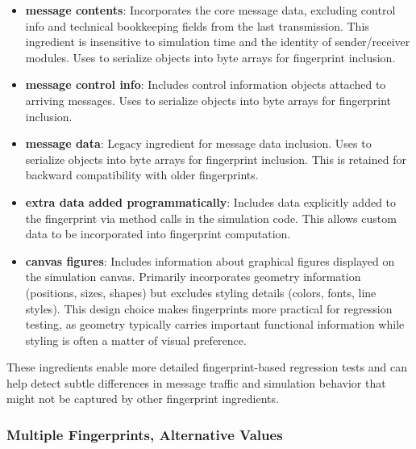 \begin{itemize}
  \item[\tbf{b}] \textbf{message contents}: Incorporates the core message data,
    excluding control info and technical bookkeeping fields from the last
    transmission. This ingredient is insensitive to simulation time and the
    identity of sender/receiver modules. Uses  to serialize
    objects into byte arrays for fingerprint inclusion.

  \item[\tbf{g}] \textbf{message control info}: Includes control information
    objects attached to arriving messages. Uses  to serialize
    objects into byte arrays for fingerprint inclusion.

  \item[\tbf{d}] \textbf{message data}: Legacy ingredient for message data
    inclusion. Uses  to serialize objects into byte arrays
    for fingerprint inclusion. This is retained for backward compatibility with
    older fingerprints.

  \item[\tbf{x}] \textbf{extra data added programmatically}: Includes data
    explicitly added to the fingerprint via  method calls in
    the simulation code. This allows custom data to be incorporated into
    fingerprint computation.

  \item[\tbf{f}] \textbf{canvas figures}: Includes information about graphical
    figures displayed on the simulation canvas. Primarily incorporates geometry
    information (positions, sizes, shapes) but excludes styling details (colors,
    fonts, line styles). This design choice makes fingerprints more practical for
    regression testing, as geometry typically carries important functional
    information while styling is often a matter of visual preference.
\end{itemize}

These ingredients enable more detailed fingerprint-based regression tests and can help detect subtle differences in message traffic and simulation behavior that might not be captured by other fingerprint ingredients.


\subsubsection{Multiple Fingerprints, Alternative Values}
\label{sec:testing:multiple-fingerprints-alternative-values}

